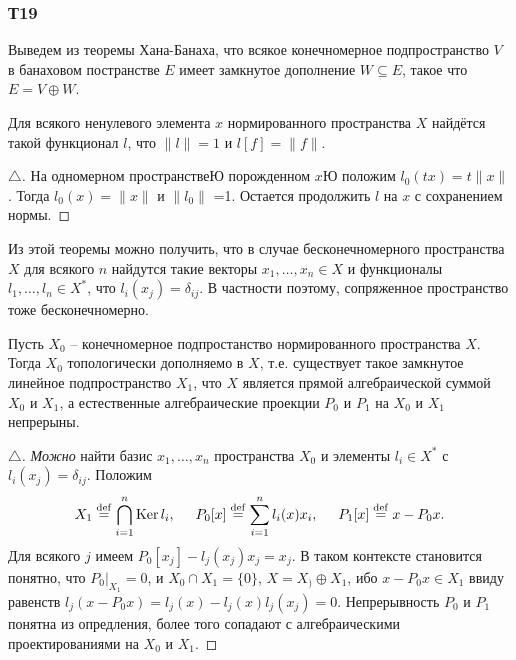 \subsubsection*{Т19}

Выведем из теоремы Хана-Банаха, что всякое конечномерное подпространство $V$ в банаховом постранстве $E$ имеет замкнутое дополнение $W \subseteq E$, такое что $E = V \oplus W$. 

\begin{to_thr}[]
    Для всякого ненулевого элемента $x$ нормированного пространства $X$ найдётся такой функционал $l$, что $\|l\|=1$ и $l[f]=\|f\|$. 
\end{to_thr}

\begin{proof}[$\triangle$]
На одномерном пространствеЮ порожденном $x$Ю положим $l_0(tx) = t \|x\|$. Тогда $l_0 (x) = \|x\|$ и $\|l_0\|$ =1. Остается продолжить $l$ на $x$ с сохранением нормы. 
\end{proof}

Из этой теоремы можно получить, что в случае бесконечномерного пространства $X$ для всякого $n$ найдутся такие векторы $x_1, \ldots, x_n \in X$ и функционалы $l_1, \ldots, l_n \in X^*$, что $l_i (x_j) = \delta_{ij}$. В частности поэтому, сопряженное пространство тоже бесконечномерно. 

\begin{to_con}
    Пусть $X_0$ -- конечномерное подпростанство нормированного пространства $X$. Тогда $X_0$ топологически дополняемо в $X$, т.е. существует такое замкнутое линейное подпространство $X_1$, что $X$ является прямой алгебраической суммой $X_0$ и $X_1$, а естественные алгебраические проекции $P_0$ и $P_1$ на $X_0$ и $X_1$ непрерыны. 
\end{to_con}

\begin{proof}[$\triangle$]
    \textit{Можно} найти базис $x_1, \ldots, x_n$ пространства $X_0$ и элементы $l_i \in X^*$ с $l_i (x_j) = \delta_{ij}$. Положим
    \begin{equation*}
        X_1 \overset{\mathrm{def}}{=}  \bigcap_{i=1}^{n} \mathop{\mathrm{Ker}}\nolimits l_i,
        \hspace{5 mm} 
        P_0 [x] \overset{\mathrm{def}}{=} \sum_{i=1}^{n} l_i (x) x_i,
        \hspace{5 mm} 
        P_1[x] \overset{\mathrm{def}}{=} x - P_0 x.
    \end{equation*}
    Для всякого $j$ имеем $P_0 [x_j] - l_j (x_j) x_j = x_j$. В таком контексте становится понятно, что $P_0 |_{X_1} = 0$, и $X_0 \cap X_1 = \{0\}$, $X = X_) \oplus X_1$, ибо $x - P_0 x \in X_1$ ввиду равенств $l_j (x-P_0 x) = l_j(x) - l_j (x) l_j(x_j) = 0$. Непрерывность $P_0$ и $P_1$ понятна из опредления, более того сопадают с алгебраическими проектированиями на $X_0$ и $X_1$.
\end{proof}


